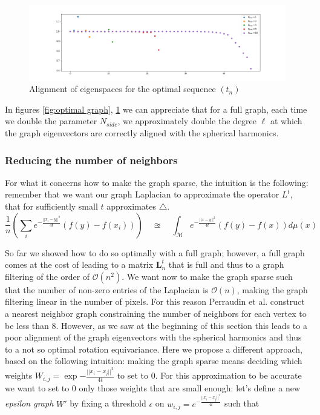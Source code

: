 \begin{figure}[h]
	\centering
	\includegraphics[width=\textwidth]{../codes/02.HeatKernelGraphLaplacian/HEALPix/06_figures/optimal_full_diagonal.png}
	\caption{\label{fig:optimal graph diagonal}Alignment of eigenspaces for the optimal sequence $(t_n)$}	
\end{figure}
In figures \ref{fig:optimal graph}, \ref{fig:optimal graph diagonal} we can appreciate that for a full graph, each time we double the parameter $N_{side}$, we approximately double the degree $\ell$ at which the graph eigenvectors are correctly aligned with the spherical harmonics.
\subsubsection{Reducing the number of neighbors}
For what it concerns how to make the graph sparse, the intuition is the following: remember that we want our graph Laplacian to approximate the operator $L^t$, that for sufficiently small $t$ approximates $\triangle$.
$$\frac{1}{n}\left(\sum_i e^{-\frac{||x_i-y||^2}{4t}}(f(y)-f(x_i)) \right) \quad \approxeq \quad \int_\mathcal M e^{-\frac{||x-y||^2}{4t}}\left(f(y)-f(x)\right)d\mu(x) $$

So far we showed how to do so optimally with a full graph; however, a full graph comes at the cost of leading to a matrix $\mathbf L_n^t$ that is full and thus to a graph filtering of the order of $\mathcal O(n^2)$. We want now to make the graph sparse such that the number of non-zero entries of the Laplacian is $\mathcal O (n)$, making the graph filtering linear in the number of pixels. For this reason Perraudin et al. \cite{DeepSphere} construct a nearest neighbor graph constraining the number of neighbors for each vertex to be less than 8. However, as we saw at the beginning of this section this leads to a poor alignment of the graph eigenvectors with the spherical harmonics and thus to a not so optimal rotation equivariance. Here we propose a different approach, based on the following intuition: making the graph sparse means deciding which weights $W_{i,j}=\exp{-\frac{||x_i-x_j||^2}{4t}}$ to set to $0$. For this approximation to be accurate we want to set to 0 only those weights that are small enough: let's define a new \textit{epsilon graph} $W'$ by fixing a threshold $\epsilon$ on $w_{i,j}=e^{-\frac{||x_i-x_j||^2}{4t}}$ such that


